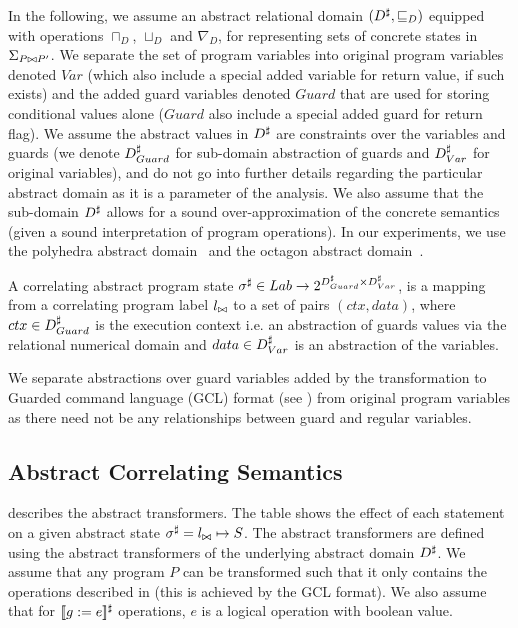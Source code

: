 In the following, we assume an abstract relational domain $(D^\sharp, \sqsubseteq_{D})$ equipped with operations $\sqcap_{D}$, $\sqcup_{D}$ and $\nabla_{D}$, for representing sets of concrete states in $\Sigma_{P \bowtie P'}$. We separate the set of program variables into original program variables denoted $Var$ (which also include a special added variable for return value, if such exists) and the added guard variables denoted $Guard$ that are used for storing conditional values alone ($Guard$ also include a special added guard for return flag). We assume the abstract values in $D^\sharp$ are constraints over the variables and guards (we denote $D^\sharp_{Guard}$ for sub-domain abstraction of guards and $D^\sharp_{Var}$ for original variables), and do not go into further details regarding the particular abstract domain as it is a parameter of the analysis. We also assume that the sub-domain $D^\sharp$ allows for a sound over-approximation of the concrete semantics (given a sound interpretation of program operations). In our experiments, we use the polyhedra abstract domain~\cite{CousotHalbwachs78} and the octagon abstract domain~\cite{Mine2006}.

\begin{definition} 
A correlating abstract program state $\sigma^\sharp \in Lab \rightarrow 2^{D^\sharp_{Guard} \times D^\sharp_{Var}}$, is a mapping from a correlating program label $l_{\bowtie}$ to a set of pairs $(ctx, data)$, where $ctx \in D^\sharp_{Guard}$ is the execution context i.e. an abstraction of guards values via the relational numerical domain and $data \in D^\sharp_{Var}$ is an abstraction of the variables.
\end{definition}

We separate abstractions over guard variables added by the transformation to Guarded command language (GCL) format (see ) from original program variables as there need not be any relationships between guard and regular variables.

\subsection{Abstract Correlating Semantics}



 describes the abstract transformers. The table shows the effect of each statement on a given abstract state $\sigma^\sharp = l_{\bowtie} \mapsto S$. The abstract transformers are defined using the abstract transformers of the underlying abstract domain $D^\sharp$. We assume that any program $P$ can be transformed such that it only contains the operations described in  (this is achieved by the GCL format). We also assume that for $\lbrack\!\lbrack g:=e \rbrack\!\rbrack^{\sharp}$ operations, $e$ is a logical operation with boolean value.

